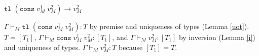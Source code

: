 \begin{case}
$\mathtt{tl}\;(\mathtt{cons}\;v_{M}^{1}\;v_{M}^{2})\rightarrow v_{M}^{2}$

$\Gamma\vdash_{M}\mathtt{tl}\;(\mathtt{cons}\;v_{M}^{1}\;v_{M}^{2}):T$ by premise and uniqueness of types (Lemma \ref{uot}).  $T=[T_{1}]$, $\Gamma\vdash_{M}\mathtt{cons}\;v_{M}^{1}\;v_{M}^{2}:[T_{1}]$, and $\Gamma\vdash_{M}v_{M}^{2}:[T_{1}]$ by inversion (Lemma \ref{i}) and uniqueness of types.  $\Gamma\vdash_{M}v_{M}^{2}:T$ because $[T_{1}]=T$.
\end{case}